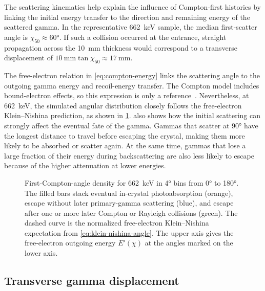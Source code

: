 The scattering kinematics help explain the influence of Compton-first histories by linking the initial energy transfer to the direction and remaining energy of the scattered gamma. In the representative \qty{662}{\kilo\electronvolt}  sample, the median first-scatter angle is $\chi_{50}\approx\ang{60}$. If such a collision occurred at the entrance, straight propagation across the \qty{10}{\milli\metre} thickness would correspond to a transverse displacement of $\qty{10}{\milli\metre}\tan\chi_{50}\approx\qty{17}{\milli\metre}$.

The free-electron relation in \cref{eq:compton-energy} links the scattering angle to the outgoing gamma energy and recoil-energy transfer.
The Compton model includes bound-electron effects, so this expression is only a reference~\parencite{geant4polarizedcomptonsource}. Nevertheless, at \qty{662}{\kilo\electronvolt}, the simulated angular distribution closely follows the free-electron Klein--Nishina prediction, as shown in \cref{fig:compton-kinematics}.
 also shows how the initial scattering can strongly affect the eventual fate of the gamma. Gammas that scatter at $\ang{90}$ have the longest distance to travel before escaping the crystal, making them more likely to be absorbed or scatter again. At the same time, gammas that lose a large fraction of their energy during backscattering are also less likely to escape because of the higher attenuation at lower energies.

\begin{figure}[!htbp]
  \captionsetup{font=small}
  \centering
  \caption{First-Compton-angle density for \qty{662}{\kilo\electronvolt}  in \ang{4} bins from \ang{0} to \ang{180}. The filled bars stack eventual in-crystal photoabsorption (orange), escape without later primary-gamma scattering (blue), and escape after one or more later Compton or Rayleigh collisions (green). The dashed curve is the normalized free-electron Klein--Nishina expectation from \cref{eq:klein-nishina-angle}. The upper axis gives the free-electron outgoing energy $E'(\chi)$ at the angles marked on the lower axis.}
  \label{fig:compton-kinematics}
\end{figure}

\subsection{Transverse gamma displacement}


